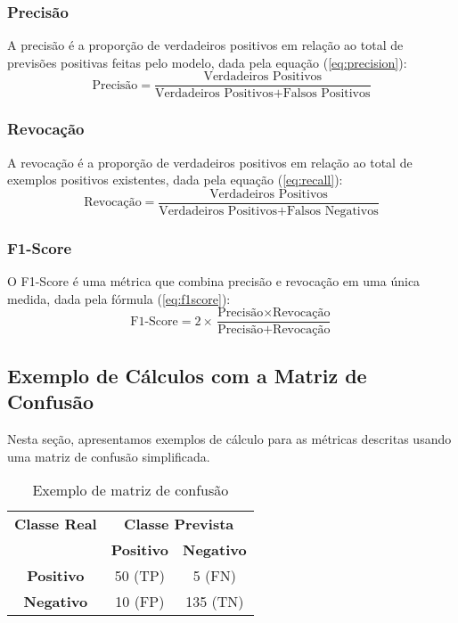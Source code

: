 \subsubsection{Precisão}
A precisão é a proporção de verdadeiros positivos em relação ao total de previsões positivas feitas pelo modelo, dada pela equação (\ref{eq:precision}):
\begin{equation}
\text{Precisão} = \frac{\text{Verdadeiros Positivos}}{\text{Verdadeiros Positivos} + \text{Falsos Positivos}} \label{eq:precision}
\end{equation}

\subsubsection{Revocação}
A revocação é a proporção de verdadeiros positivos em relação ao total de exemplos positivos existentes, dada pela equação (\ref{eq:recall}):
\begin{equation}
\text{Revocação} = \frac{\text{Verdadeiros Positivos}}{\text{Verdadeiros Positivos} + \text{Falsos Negativos}} \label{eq:recall}
\end{equation}

\subsubsection{F1-Score}
O F1-Score é uma métrica que combina precisão e revocação em uma única medida, dada pela fórmula (\ref{eq:f1score}):
\begin{equation}
\text{F1-Score} = 2 \times \frac{\text{Precisão} \times \text{Revocação}}{\text{Precisão} + \text{Revocação}} \label{eq:f1score}
\end{equation}

\subsection{Exemplo de Cálculos com a Matriz de Confusão}

Nesta seção, apresentamos exemplos de cálculo para as métricas descritas usando uma matriz de confusão simplificada.

\begin{table}[h]
\centering
\caption{Exemplo de matriz de confusão}
\label{tab:exemplo_matriz_confusao}
\begin{tabular}{c|cc}
\multicolumn{1}{c}{\textbf{Classe Real}} & \multicolumn{2}{c}{\textbf{Classe Prevista}} \\ \cline{2-3}
\multicolumn{1}{c}{} & \textbf{Positivo} & \textbf{Negativo} \\ \hline
\textbf{Positivo} & 50 (TP) & 5 (FN) \\
\textbf{Negativo} & 10 (FP) & 135 (TN) \\ \hline
\end{tabular}
\end{table}

